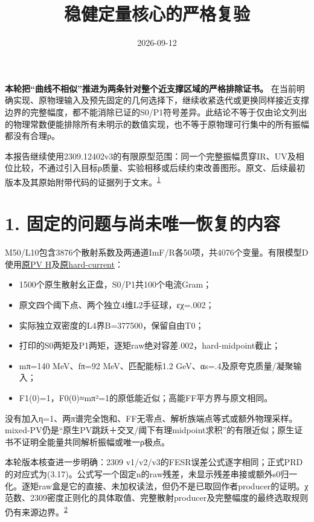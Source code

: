 \documentclass[
  10pt,
  a4paper,
]{article}
\title{稳健定量核心的严格复验}
\author{}
\date{2026-09-12}
\providecommand{\tightlist}{%
  \setlength{\itemsep}{0pt}\setlength{\parskip}{0pt}}
\begin{document}
\maketitle

\textbf{本轮把``曲线不相似''推进为两条针对整个近支撑区域的严格排除证书。}
在当前明确实现、原物理输入及预先固定的几何选择下，继续收紧迭代或更换同样接近支撑边界的完整幅度，都不能消除已证的S0/P1符号差异。此结论不等于仅由论文列出的物理常数便能排除所有未明示的数值实现，也不等于原物理可行集中的所有振幅都没有合理ρ。

本报告继续使用2309.12402v3的有限原型范围：同一个完整振幅贯穿IR、UV及相位比较，不通过引入目标ρ质量、实验相移或后续约束改善图形。原文、后续最初版本及其原始附带代码的证据列于文末。\textsuperscript{\hyperref[source-paper]{1}}

\begingroup
\small
\setlength{\parskip}{0pt}
\setcounter{tocdepth}{1}
\tableofcontents
\endgroup
\clearpage

\section{1.
固定的问题与尚未唯一恢复的内容}\label{ux56faux5b9aux7684ux95eeux9898ux4e0eux5c1aux672aux552fux4e00ux6062ux590dux7684ux5185ux5bb9}

M50/L10包含3876个散射系数及两通道ImF/R各50项，共4076个变量。有限模型D使用\href{../../stage_B_pv_M50_L10_prepare_20260907/report.json}{原PV
H}及\href{../../mainline_alignment_20260909/D1_hard_M50/report.json}{原hard-current}：

\begin{itemize}
\tightlist
\item
  1500个原生散射幺正盘，S0/P1共100个电流Gram；
\item
  原文四个阈下点、两个独立4维L2手征球，εχ=.002；
\item
  实际独立双密度的L4界B=377500，保留自由T0；
\item
  打印的S0两矩及P1两矩，逐矩raw绝对容差.002，hard-midpoint截止；
\item
  mπ=140 MeV、fπ=92 MeV、匹配能标1.2 GeV、αs=.4及原夸克质量/凝聚输入；
\item
  F1(0)=1，F0(0)≈mπ²=1的原低能近似；高能FF平方界与原文相同。
\end{itemize}

没有加入η=1、两π谱完全饱和、FF无零点、解析族端点等式或额外物理采样。mixed-PV仍是``原生PV跳跃＋交叉/阈下有理midpoint求积''的有限近似；原生证书不证明全能量共同解析振幅或唯一ρ极点。

本轮版本核查进一步明确：2309
v1/v2/v3的FESR误差公式逐字相同；正式PRD的对应式为(3.17)。公式写一个固定n的raw残差，未显示残差串接或额外s0归一化。逐矩raw盒是它的直接、未加权读法，但仍不是已取回作者producer的证明。χ范数、2309密度正则化的具体取值、完整散射producer及完整幅度的最终选取规则仍有来源边界。\textsuperscript{\hyperref[source-norm]{2}}
\end{document}
